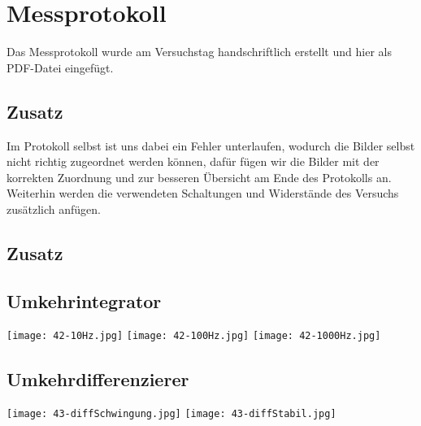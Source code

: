 

\def\skalierung{0.65}

\chapter{Messprotokoll}
\label{chap:protokoll}

Das Messprotokoll wurde am Versuchstag handschriftlich erstellt und hier als
PDF-Datei eingefügt. 

\section*{Zusatz}
Im Protokoll selbst ist uns dabei ein Fehler unterlaufen, wodurch die Bilder selbst nicht richtig zugeordnet werden können, dafür fügen wir die Bilder mit der korrekten Zuordnung und zur besseren Übersicht am Ende des Protokolls an. Weiterhin werden die verwendeten Schaltungen und Widerstände des Versuchs zusätzlich anfügen.

%

\section*{Zusatz}

\section*{Umkehrintegrator}
\begin{center}
    \texttt{[image: 42-10Hz.jpg]}
    \texttt{[image: 42-100Hz.jpg]}
    \texttt{[image: 42-1000Hz.jpg]}
\end{center}

\section*{Umkehrdifferenzierer}
\begin{center}
    \texttt{[image: 43-diffSchwingung.jpg]}
    \texttt{[image: 43-diffStabil.jpg]}
\end{center}
\newpage

